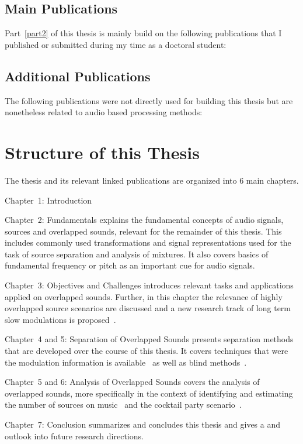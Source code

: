 \begin{refsection}
\section{Main Publications}
Part~\ref{part2} of this thesis is mainly build on the following publications that I published or submitted during my time as a doctoral student:
\nocite{*}
\printbibliography[sorting=nyt, heading=none]
\end{refsection}

\begin{refsection}
\section{Additional Publications}
The following publications were not directly used for building this thesis but are nonetheless related to audio based processing methods:
\nocite{*}
\printbibliography[heading=none]
\end{refsection}

\section{Structure of this Thesis}

The thesis and its relevant linked publications are organized into 6 main chapters.
\begin{description}
  \item Chapter~1: Introduction
  \item Chapter~2: Fundamentals explains the fundamental concepts of audio signals, sources and overlapped sounds, relevant for the remainder of this thesis. This includes commonly used transformations and signal representations used for the task of source separation and analysis of mixtures. It also covers basics of fundamental frequency or pitch as an important cue for audio signals.
  \item Chapter~3: Objectives and Challenges introduces relevant tasks and applications applied on overlapped sounds. Further, in this chapter the relevance of highly overlapped source scenarios are discussed and a new research track of long term slow modulations is proposed~\cite{rafii}.
  \item Chapter~4 and 5: Separation of Overlapped Sounds presents separation methods that are developed over the course of this thesis. It covers techniques that were the modulation information is available~\cite{stoeter15, stoeter15acm, stoeter15icassp} as well as blind methods~\cite{stoeter16, liutkus17}.
  \item Chapter~5 and 6: Analysis of Overlapped Sounds covers the analysis of overlapped sounds, more specifically in the context of identifying and estimating the number of sources on music~\cite{schoeffler13, stoeter13} and the cocktail party scenario~\cite{stoeter19, stoeter18}.
  \item Chapter~7: Conclusion summarizes and concludes this thesis and gives a and outlook into future research directions.
\end{description}
